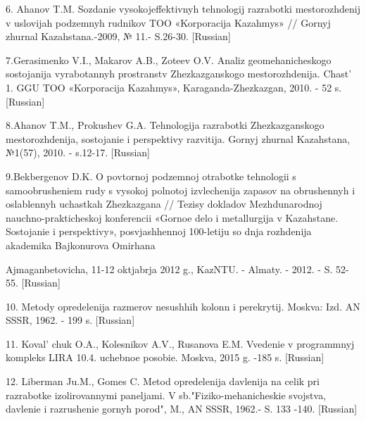 \begin{references}
6. Ahanov T.M. Sozdanie vysokojeffektivnyh tehnologij razrabotki
mestorozhdenij v uslovijah podzemnyh rudnikov TOO «Korporacija Kazahmys»
// Gornyj zhurnal Kazahstana.-2009, № 11.- S.26-30. {[}Russian{]}

7.Gerasimenko V.I., Makarov A.B., Zoteev O.V. Analiz geomehanicheskogo
sostojanija vyrabotannyh prostranstv Zhezkazganskogo mestorozhdenija.
Chast'{} 1. GGU TOO «Korporacija Kazahmys»,
Karaganda-Zhezkazgan, 2010. - 52 s. {[}Russian{]}

8.Ahanov T.M., Prokushev G.A. Tehnologija razrabotki Zhezkazganskogo
mestorozhdenija, sostojanie i perspektivy razvitija. Gornyj zhurnal
Kazahstana, №1(57), 2010. - s.12-17. {[}Russian{]}

9.Bekbergenov D.K. O povtornoj podzemnoj otrabotke tehnologii s
samoobrusheniem rudy s vysokoj polnotoj izvlechenija zapasov na
obrushennyh i oslablennyh uchastkah Zhezkazgana // Tezisy dokladov
Mezhdunarodnoj nauchno-prakticheskoj konferencii «Gornoe delo i
metallurgija v Kazahstane. Sostojanie i perspektivy», posvjashhennoj
100-letiju so dnja rozhdenija akademika Bajkonurova Omirhana

Ajmaganbetovicha, 11-12 oktjabrja 2012 g., KazNTU. - Almaty. - 2012. -
S. 52-55. {[}Russian{]}

10. Metody opredelenija razmerov nesushhih kolonn i perekrytij. Moskva:
Izd. AN SSSR, 1962. - 199 s. {[}Russian{]}

11. Koval' chuk O.A., Kolesnikov A.V., Rusanova E.M.
Vvedenie v programmnyj kompleks LIRA 10.4. uchebnoe posobie. Moskva,
2015 g. -185 s. {[}Russian{]}

12. Liberman Ju.M., Gomes C. Metod opredelenija davlenija na celik pri
razrabotke izolirovannymi \linebreak paneljami. V sb."Fiziko-mehanicheskie
svojstva, davlenie i razrushenie gornyh porod", M., AN SSSR, 1962.- S.
133 -140. {[}Russian{]}
\end{references}


